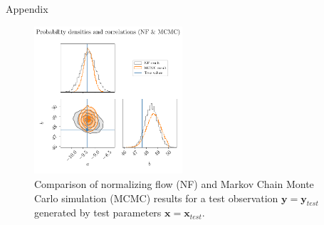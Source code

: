 \documentclass{beamer}
\newcommand\vect[1]{\ensuremath{\bm{#1}}}
\begin{document}
\begin{frame}[allowframebreaks]{Appendix}
	\begin{figure}[h!]
		\centering
		\includegraphics[width=0.49\textwidth]{figures/thesis/nf-linear-regression-example-corner-mcmc-nf.pdf}
		\caption{Comparison of normalizing flow (NF) and Markov Chain Monte Carlo simulation (MCMC) results for a test observation $\vect{y} = \vect{y}_{test}$ generated by test parameters $\vect{x} = \vect{x}_{test}$.}
		\label{fig:nf-linear-regression-example-corner-mcmc-nf}
	\end{figure}
	

\end{frame}
\end{document}
